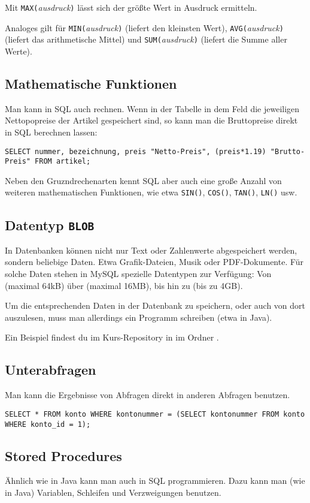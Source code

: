 Mit \lstinline|MAX(|\emph{ausdruck}\lstinline|)| lässt sich der größte Wert in
Ausdruck ermitteln.

Analoges gilt für \lstinline|MIN(|\emph{ausdruck}\lstinline|)| (liefert den
kleinsten Wert), \lstinline|AVG(|\emph{ausdruck}\lstinline|)| (liefert das
arithmetische Mittel) und \lstinline|SUM(|\emph{ausdruck}\lstinline|)| (liefert
die Summe aller Werte).


\subsection{Mathematische Funktionen}

Man kann in SQL auch rechnen. Wenn in der Tabelle  in dem
Feld  die jeweiligen Nettopopreise der Artikel gespeichert
sind, so kann man die Bruttopreise direkt in SQL berechnen lassen:

\begin{lstlisting}
SELECT nummer, bezeichnung, preis "Netto-Preis", (preis*1.19) "Brutto-Preis" FROM artikel;
\end{lstlisting}

Neben den Gruzndrechenarten kennt SQL aber auch eine große Anzahl von weiteren
mathematischen Funktionen, wie etwa \lstinline|SIN()|, \lstinline|COS()|,
\lstinline|TAN()|, \lstinline|LN()| usw.

\subsection{Datentyp \texttt{BLOB}}

In Datenbanken können nicht nur Text oder Zahlenwerte abgespeichert werden,
sondern beliebige Daten. Etwa Grafik-Dateien, Musik oder PDF-Dokumente. Für
solche Daten stehen in MySQL spezielle Datentypen zur Verfügung:
Von  (maximal 64kB) über  (maximal
16MB), bis hin zu  (bis zu 4GB).

Um die entsprechenden Daten in der Datenbank zu speichern, oder auch von dort
auszulesen, muss man allerdings ein Programm schreiben (etwa in Java).

Ein Beispiel findest du im Kurs-Repository in
 im Ordner .

\subsection{Unterabfragen}

Man kann die Ergebnisse von Abfragen direkt in anderen Abfragen benutzen.

\begin{lstlisting}
SELECT * FROM konto WHERE kontonummer = (SELECT kontonummer FROM konto WHERE konto_id = 1);
\end{lstlisting}

\subsection{Stored Procedures}

Ähnlich wie in Java kann man auch in SQL programmieren. Dazu kann man (wie in
Java) Variablen, Schleifen und Verzweigungen benutzen.
